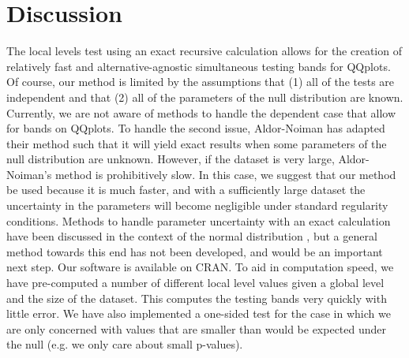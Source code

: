 \documentclass[article]{jss}
\begin{document}
\section{Discussion}
The local levels test using an exact recursive calculation allows for the creation of relatively fast and alternative-agnostic simultaneous testing bands for QQplots. Of course, our method is limited by the assumptions that (1) all of the tests are independent and that (2) all of the parameters of the null distribution are known. Currently, we are not aware of methods to handle the dependent case that allow for bands on QQplots. To handle the second issue, Aldor-Noiman has adapted their method such that it will yield exact results when some parameters of the null distribution are unknown. However, if the dataset is very large, Aldor-Noiman's method is prohibitively slow. In this case, we suggest that our method be used because it is much faster, and with a sufficiently large dataset the uncertainty in the parameters will become negligible under standard regularity conditions. Methods to handle parameter uncertainty with an exact calculation have been discussed in the context of the normal distribution \citep{rosenkrantz2000confidence}, but a general method towards this end has not been developed, and would be an important next step.
\newline
\newline
Our software is available on CRAN. To aid in computation speed, we have pre-computed a number of different local level values given a global level and the size of the dataset. This computes the testing bands very quickly with little error. We have also implemented a one-sided test for the case in which we are only concerned with values that are smaller than would be expected under the null (e.g. we only care about small p-values).


%
\end{document}
